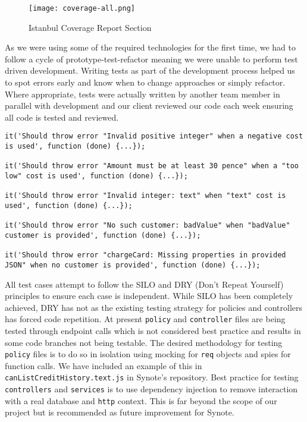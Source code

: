 \begin{figure}[!hbt]
  \centering
 	\texttt{[image: coverage-all.png]}
  \caption{Istanbul Coverage Report Section}
 	\label{fig:coverage}
\end{figure}

As we were using some of the required technologies for the first time, we had to follow a cycle of prototype-test-refactor meaning we were unable to perform test driven development. Writing tests as part of the development process helped us to spot errors early and know when to change approaches or simply refactor. Where appropriate, tests were actually written by another team member in parallel with development and our client reviewed our code each week ensuring all code is tested and reviewed.\\

\begin{listing}[H]
\begin{verbatim}
it('Should throw error "Invalid positive integer" when a negative cost is used', function (done) {...});

it('Should throw error "Amount must be at least 30 pence" when a "too low" cost is used', function (done) {...});

it('Should throw error "Invalid integer: text" when "text" cost is used', function (done) {...});

it('Should throw error "No such customer: badValue" when "badValue" customer is provided', function (done) {...});

it('Should throw error "chargeCard: Missing properties in provided JSON" when no customer is provided', function (done) {...});

\end{verbatim}
\label{lst:stripe-test-cases}
\end{listing}

All test cases attempt to follow the SILO and DRY (Don't Repeat Yourself) principles to ensure each case is independent. While SILO has been completely achieved, DRY has not as the existing testing strategy for policies and controllers has forced code repetition. At present \texttt{policy} and \texttt{controller} files are being tested through endpoint calls which is not considered best practice and results in some code branches not being testable. The desired methodology for testing \texttt{policy} files is to do so in isolation using mocking for \texttt{req} objects and spies for function calls. We have included an example of this in \texttt{canListCreditHistory.text.js} in Synote's repository. Best practice for testing \texttt{controllers} and \texttt{services} is to use dependency injection to remove interaction with a real database and \texttt{http} context. This is far beyond the scope of our project but is recommended as future improvement for Synote.

